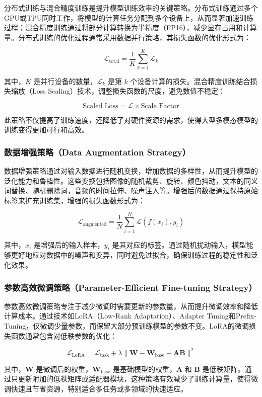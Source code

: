 \documentclass[12pt]{article}
\begin{document}
分布式训练与混合精度训练是提升模型训练效率的关键策略。分布式训练通过多个GPU或TPU同时工作，将模型的计算任务分配到多个设备上，从而显著加速训练过程；混合精度训练通过将部分计算转换为半精度（FP16），减少显存占用和计算量。分布式训练的优化过程通常采用数据并行策略，其损失函数的优化形式为：

\[
\mathcal{L}_{\text{total}} = \frac{1}{K} \sum_{k=1}^{K} \mathcal{L}_k
\]

其中，\( K \) 是并行设备的数量，\( \mathcal{L}_k \) 是第 \( k \) 个设备计算的损失。混合精度训练结合损失缩放（Loss Scaling）技术，调整损失函数的尺度，避免数值不稳定：

\[
\text{Scaled Loss} = \mathcal{L} \times \text{Scale Factor}
\]

此策略不仅提高了训练速度，还降低了对硬件资源的需求，使得大型多模态模型的训练变得更加可行和高效。

\subsubsection{数据增强策略（Data Augmentation Strategy）}

数据增强策略通过对输入数据进行随机变换，增加数据的多样性，从而提升模型的泛化能力和鲁棒性。这些变换包括图像的随机裁剪、旋转、颜色抖动，文本的同义词替换、随机删除词，音频的时间拉伸、噪声注入等。增强后的数据通过保持原始标签来扩充训练集，增强的损失函数形式为：

\[
\mathcal{L}_{\text{augmented}} = \frac{1}{N} \sum_{i=1}^{N} \mathcal{L}(f(x_i), y_i)
\]

其中，\( x_i \) 是增强后的输入样本，\( y_i \) 是其对应的标签。通过随机扰动输入，模型能够更好地应对数据中的噪声和变异，同时避免过拟合，确保训练过程的稳定性和泛化效果。

\subsubsection{参数高效微调策略（Parameter-Efficient Fine-tuning Strategy）}

参数高效微调策略专注于减少微调时需要更新的参数量，从而提升微调效率和降低计算成本。通过技术如LoRA（Low-Rank Adaptation）、Adapter Tuning和Prefix-Tuning，仅微调少量参数，而保留大部分预训练模型的参数不变。LoRA的微调损失函数通常包含对低秩参数的优化：

\[
\mathcal{L}_{\text{LoRA}} = \mathcal{L}_{\text{task}} + \lambda \|\mathbf{W} - \mathbf{W}_{\text{base}} - \mathbf{A}\mathbf{B}\|^2
\]

其中，\( \mathbf{W} \) 是微调后的权重，\( \mathbf{W}_{\text{base}} \) 是基础模型的权重，\( \mathbf{A} \) 和 \( \mathbf{B} \) 是低秩矩阵。通过只更新附加的低秩矩阵或适配器模块，这种策略有效减少了训练计算量，使得微调快速且节省资源，特别适合多任务或多领域的快速适应。
\end{document}
